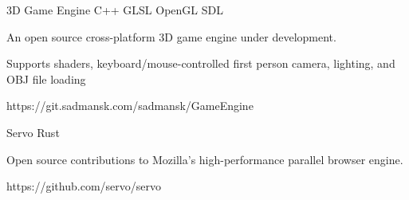 



\begin{cvprojects}

\cvproject
{3D Game Engine}
{C++ \textbullet{} GLSL \textbullet{} OpenGL \textbullet{} SDL}
{
An open source cross-platform 3D game engine under development.
\begin{cvitems}
\item[]
\item {Supports shaders, keyboard/mouse-controlled first person camera, lighting, and OBJ file loading}
\end{cvitems}
}
{https://git.sadmansk.com/sadmansk/GameEngine}


\cvproject
{Servo}
{Rust}
{
Open source contributions to Mozilla's high-performance parallel browser engine.
    \begin{cvitems}\end{cvitems} %
}
{https://github.com/servo/servo}


\end{cvprojects}
